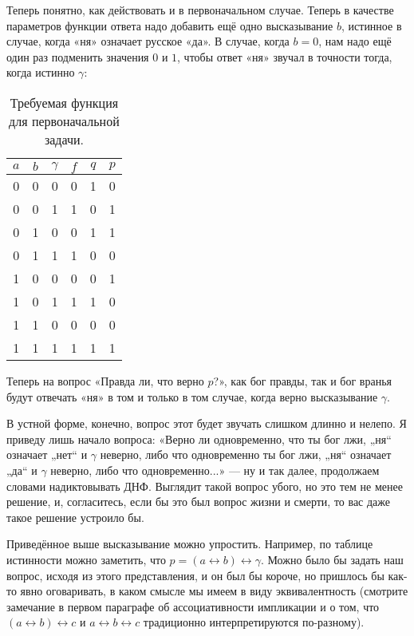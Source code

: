 Теперь понятно, как действовать и в первоначальном случае. Теперь в качестве параметров функции ответа надо добавить ещё одно высказывание $b$, истинное в случае, когда «ня» означает русское «да». В случае, когда $b = 0$, нам надо ещё один раз подменить значения $0$ и $1$, чтобы ответ «ня» звучал в точности тогда, когда истинно $\gamma$:

\begin{table}[h]
\centering
\begin{tabular}{ccc|ccc}
$a$ & $b$ & $\gamma$ & $f$ & $q$ & $p$ \\
\hline
 0  &  0  &     0    &  0  &  1  &  0  \\
 0  &  0  &     1    &  1  &  0  &  1  \\
 0  &  1  &     0    &  0  &  1  &  1  \\
 0  &  1  &     1    &  1  &  0  &  0  \\
 1  &  0  &     0    &  0  &  0  &  1  \\
 1  &  0  &     1    &  1  &  1  &  0  \\
 1  &  1  &     0    &  0  &  0  &  0  \\
 1  &  1  &     1    &  1  &  1  &  1
\end{tabular}
\caption{Требуемая функция для первоначальной задачи.}
\end{table}

Теперь на вопрос «Правда ли, что верно $p$?», как бог правды, так и бог вранья будут отвечать «ня» в том и только в том случае, когда верно высказывание $\gamma$.

В устной форме, конечно, вопрос этот будет звучать слишком длинно и нелепо. Я приведу лишь начало вопроса: «Верно ли одновременно, что ты бог лжи, „ня“ означает „нет“ и $\gamma$ неверно, либо что одновременно ты бог лжи, „ня“ означает „да“ и $\gamma$ неверно, либо что одновременно...» — ну и так далее, продолжаем словами надиктовывать ДНФ. Выглядит такой вопрос убого, но это тем не менее решение, и, согласитесь, если бы это был вопрос жизни и смерти, то вас даже такое решение устроило бы.

Приведённое выше высказывание можно упростить. Например, по таблице истинности можно заметить, что $p = (a \leftrightarrow b) \leftrightarrow \gamma$. Можно было бы задать наш вопрос, исходя из этого представления, и он был бы короче, но пришлось бы как-то явно оговаривать, в каком смысле мы имеем в виду эквивалентность (смотрите замечание в первом параграфе об ассоциативности импликации и о том, что $(a\leftrightarrow b)\leftrightarrow c$ и $a \leftrightarrow b \leftrightarrow c$ традиционно интерпретируются по-разному).

